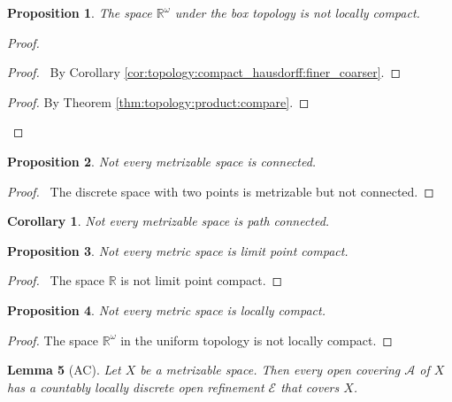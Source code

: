 \documentclass{report}
\let\qed\relax
\newtheorem{lm}{Lemma}[section]
\newtheorem{prop}[lm]{Proposition}
\newtheorem{cor}{Corollary}[lm]
\theoremstyle{definition}
\begin{document}
 \begin{prop}
 	The space $\mathbb{R}^\omega$ under the box topology is not locally compact.
 \end{prop}

 \begin{proof}
 	\pf
 	\begin{proof}
 		\pf\ By Corollary \ref{cor:topology:compact_hausdorff:finer_coarser}.
 	\end{proof}
 	\begin{proof}
 		\pf By Theorem \ref{thm:topology:product:compare}.
 	\end{proof}
 	\qed
 \end{proof}

 \begin{prop}
 Not every metrizable space is connected.
\end{prop}

\begin{proof}
 \pf\ The discrete space with two points is metrizable but not connected. \qed
\end{proof}

\begin{cor}
 Not every metrizable space is path connected.
\end{cor}

\begin{prop}
  Not every metric space is limit point compact.
\end{prop}

\begin{proof}
  \pf\ The space $\mathbb{R}$ is not limit point compact. \qed
\end{proof}

\begin{prop}
  Not every metric space is locally compact.
\end{prop}

\begin{proof}
  The space $\mathbb{R}^\omega$ in the uniform topology is not locally compact.
\end{proof}

\begin{lm}[AC]
  \label{lm:topology:metric:locally_discrete_open_refinement}
  Let $X$ be a metrizable space. Then every open covering $\mathcal{A}$ of $X$ has a countably locally discrete open refinement $\mathcal{E}$ that covers $X$.
\end{lm}
\end{document}
